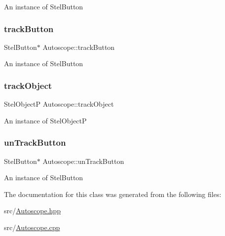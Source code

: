 An instance of Stel\+Button \mbox{\label{class_autoscope_a816e3212639b4204e9917704e02b0d09}} 
\subsubsection{\texorpdfstring{trackButton}{trackButton}}
{\footnotesize\ttfamily Stel\+Button$\ast$ Autoscope\+::track\+Button\hspace{0.3cm}{\ttfamily [private]}}

An instance of Stel\+Button \mbox{\label{class_autoscope_a170fbbc7b2a719517912aa3614727021}} 
\subsubsection{\texorpdfstring{trackObject}{trackObject}}
{\footnotesize\ttfamily Stel\+ObjectP Autoscope\+::track\+Object\hspace{0.3cm}{\ttfamily [private]}}

An instance of Stel\+ObjectP \mbox{\label{class_autoscope_a5d3be6a8522dc18b921936b57c8e661c}} 
\subsubsection{\texorpdfstring{unTrackButton}{unTrackButton}}
{\footnotesize\ttfamily Stel\+Button$\ast$ Autoscope\+::un\+Track\+Button\hspace{0.3cm}{\ttfamily [private]}}

An instance of Stel\+Button 

The documentation for this class was generated from the following files\+:\begin{DoxyCompactItemize}
\item 
src/\mbox{\hyperlink{_autoscope_8hpp}{Autoscope.\+hpp}}\item 
src/\mbox{\hyperlink{_autoscope_8cpp}{Autoscope.\+cpp}}\end{DoxyCompactItemize}
